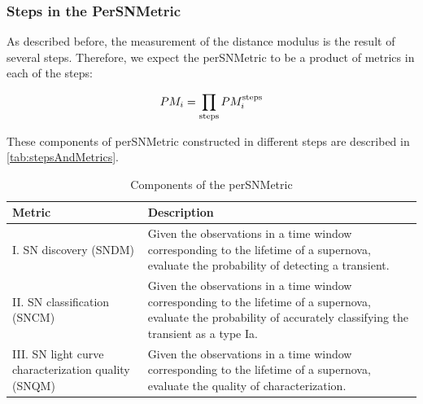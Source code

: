 
\subsubsection{Steps in the PerSNMetric}
\label{sec:persnmetric}
As described before, the measurement of the distance modulus is the
result of several steps. Therefore, we expect the perSNMetric to be a
product of metrics in each of the steps:

\begin{equation}
PM_i = \prod_{\rm{steps}} PM_i^{\rm{steps}}
\end{equation}

These components of perSNMetric constructed in different steps are
described in \autoref{tab:stepsAndMetrics}.
\begin{center}
 \begin{table}
\begin{tabular}{| p{5cm} |p{10cm}| }
\hline Metric & Description \\
\hline
I. SN discovery  (SNDM) &  Given the observations in a time window corresponding to the lifetime of
a supernova, evaluate the  probability of detecting a
transient. \\
II. SN classification (SNCM) & Given the observations in a time window corresponding to the
lifetime of a
supernova, evaluate the probability of accurately classifying the transient as a type Ia.\\
III. SN light curve characterization quality (SNQM) & Given the observations in a time window
corresponding to the lifetime of a supernova, evaluate the quality of characterization.\\
\hline
\end{tabular}
\caption{Components of the perSNMetric}
\label{tab:stepsAndMetrics}
\end{table}
\end{center}




